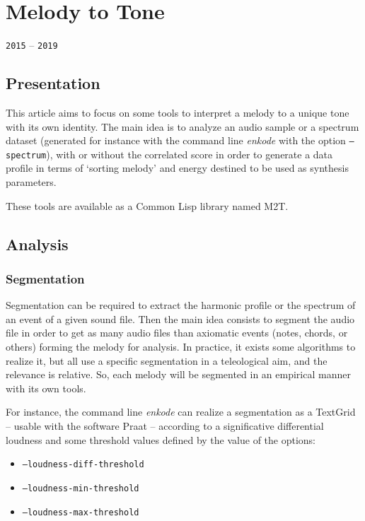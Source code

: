 \chapter{Melody to Tone}
\thispagestyle{empty}

\label{m2t}

{\texttt{2015} -- \texttt{2019}}

\bigskip
\smallskip

\section{Presentation}

This article aims to focus on some tools to interpret a melody to a unique tone with its own identity. The main idea is to analyze an audio sample or a spectrum dataset (generated for instance with the command line \textsl{enkode} with the option \texttt{--spectrum}), with or without the correlated score in order to generate a data profile in terms of `sorting melody' and energy destined to be used as synthesis parameters.

These tools are available as a Common Lisp library named M2T.

\section{Analysis}

\subsection{Segmentation}

Segmentation can be required to extract the harmonic profile or the spectrum of an event of a given sound file. Then the main idea consists to segment the audio file in order to get as many audio files than axiomatic events (notes, chords, or others) forming the melody for analysis.
In practice, it exists some algorithms to realize it, but all use a specific segmentation in a teleological aim, and the relevance is relative. So, each melody will be segmented in an empirical manner with its own tools.

For instance, the command line \textsl{enkode} can realize a segmentation as a TextGrid -- usable with the software Praat -- according to a significative differential loudness and some threshold values defined by the value of the options:
\begin{itemize}
  \item \texttt{--loudness-diff-threshold}
  \item \texttt{--loudness-min-threshold}
  \item \texttt{--loudness-max-threshold}
\end{itemize}

